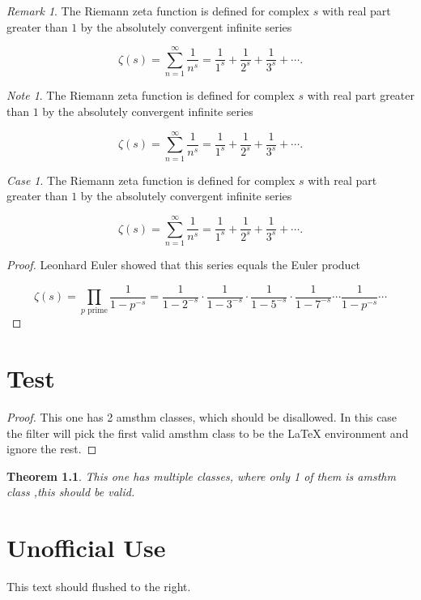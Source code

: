 \documentclass[english,oneside, article]{memoir}
\theoremstyle{plain}
\newtheorem{Theorem}{Theorem}[chapter]
\theoremstyle{definition}
\theoremstyle{remark}
\newtheorem{Case}{Case}[chapter]
\newtheorem*{Remark}{Remark}
\newtheorem*{Note}{Note}
\begin{document}
\begin{Remark}

The Riemann zeta function is defined for complex \(s\) with real part
greater than \(1\) by the absolutely convergent infinite series

\[\zeta(s) = \sum_{n=1}^\infty \frac{1}{n^s} = \frac{1}{1^s} + \frac{1}{2^s} + \frac{1}{3^s} + \cdots.\]

\end{Remark}

\begin{Note}

The Riemann zeta function is defined for complex \(s\) with real part
greater than \(1\) by the absolutely convergent infinite series

\[\zeta(s) = \sum_{n=1}^\infty \frac{1}{n^s} = \frac{1}{1^s} + \frac{1}{2^s} + \frac{1}{3^s} + \cdots.\]

\end{Note}

\begin{Case}

The Riemann zeta function is defined for complex \(s\) with real part
greater than \(1\) by the absolutely convergent infinite series

\[\zeta(s) = \sum_{n=1}^\infty \frac{1}{n^s} = \frac{1}{1^s} + \frac{1}{2^s} + \frac{1}{3^s} + \cdots.\]

\end{Case}

\begin{proof}

Leonhard Euler showed that this series equals the Euler product

\[\zeta(s) = \prod_{p \text{ prime}} \frac{1}{1-p^{-s}}= \frac{1}{1-2^{-s}}\cdot\frac{1}{1-3^{-s}}\cdot\frac{1}{1-5^{-s}}\cdot\frac{1}{1-7^{-s}} \cdots \frac{1}{1-p^{-s}} \cdots\]

\end{proof}

\chapter{Test}\label{test}

\begin{proof}

This one has 2 amsthm classes, which should be disallowed. In this case
the filter will pick the first valid amsthm class to be the LaTeX
environment and ignore the rest.

\end{proof}

\begin{Theorem}

This one has multiple classes, where only 1 of them is amsthm class
,this should be valid.

\end{Theorem}

\chapter{Unofficial Use}\label{unofficial-use}

\begin{flushright}

This text should flushed to the right.

\end{flushright}
\end{document}
